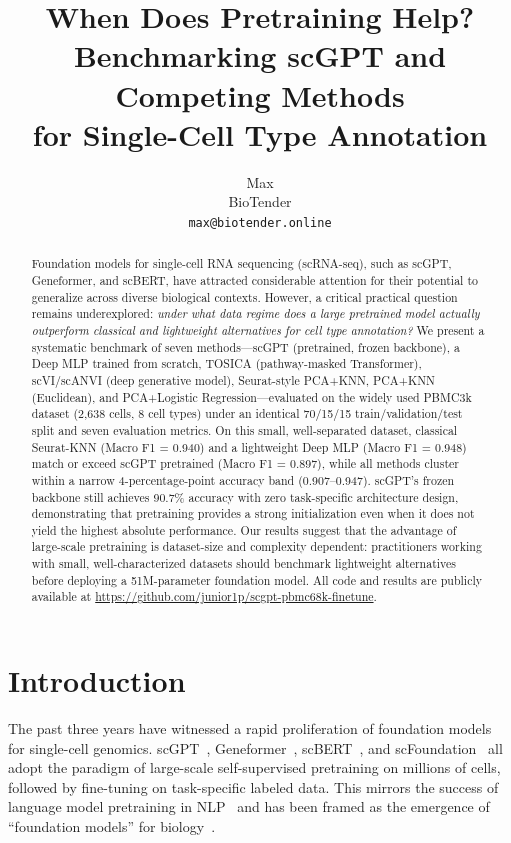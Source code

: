 \documentclass{article}
\title{When Does Pretraining Help?\\
Benchmarking scGPT and Competing Methods\\
for Single-Cell Type Annotation}
\author{%
  Max \\
  BioTender \\
  \texttt{max@biotender.online}
}
\begin{document}
\maketitle

\begin{abstract}
Foundation models for single-cell RNA sequencing (scRNA-seq), such as scGPT, Geneformer,
and scBERT, have attracted considerable attention for their potential to generalize across
diverse biological contexts. However, a critical practical question remains underexplored:
\emph{under what data regime does a large pretrained model actually outperform classical
and lightweight alternatives for cell type annotation?}
We present a systematic benchmark of seven methods---scGPT (pretrained, frozen backbone),
a Deep MLP trained from scratch, TOSICA (pathway-masked Transformer), scVI/scANVI
(deep generative model), Seurat-style PCA+KNN, PCA+KNN (Euclidean), and PCA+Logistic
Regression---evaluated on the widely used PBMC3k dataset (2,638 cells, 8 cell types)
under an identical 70/15/15 train/validation/test split and seven evaluation metrics.
On this small, well-separated dataset, classical Seurat-KNN (Macro F1 = 0.940) and a
lightweight Deep MLP (Macro F1 = 0.948) match or exceed scGPT pretrained (Macro F1 = 0.897),
while all methods cluster within a narrow 4-percentage-point accuracy band (0.907--0.947).
scGPT's frozen backbone still achieves 90.7\% accuracy with zero task-specific architecture
design, demonstrating that pretraining provides a strong initialization even when it does
not yield the highest absolute performance.
Our results suggest that the advantage of large-scale pretraining is dataset-size and
complexity dependent: practitioners working with small, well-characterized datasets should
benchmark lightweight alternatives before deploying a 51M-parameter foundation model.
All code and results are publicly available at
\url{https://github.com/junior1p/scgpt-pbmc68k-finetune}.
\end{abstract}

\section{Introduction}
\label{sec:intro}

The past three years have witnessed a rapid proliferation of foundation models for
single-cell genomics. scGPT~\citep{cui2024scgpt}, Geneformer~\citep{theodoris2023transfer},
scBERT~\citep{yang2022scbert}, and scFoundation~\citep{hao2024foundation} all adopt the
paradigm of large-scale self-supervised pretraining on millions of cells, followed by
fine-tuning on task-specific labeled data. This mirrors the success of language model
pretraining in NLP~\citep{devlin2018bert,brown2020language} and has been framed as the
emergence of ``foundation models'' for biology~\citep{bommasani2021opportunities}.
\end{document}
